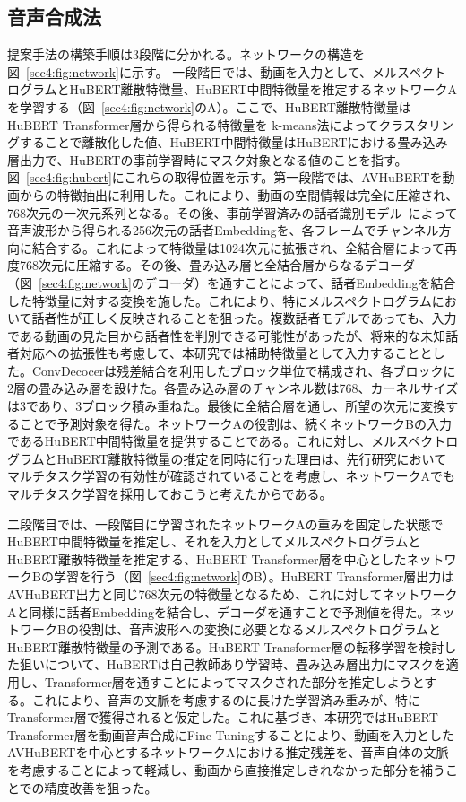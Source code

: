 \documentclass[12pt]{jarticle}
\numberwithin{equation}{section}    %
\numberwithin{figure}{section}      %
\numberwithin{table}{section}      %
\begin{document}
\subsection{音声合成法}
提案手法の構築手順は3段階に分かれる。ネットワークの構造を図~\ref{sec4:fig:network}に示す。
一段階目では、動画を入力として、メルスペクトログラムとHuBERT離散特徴量、HuBERT中間特徴量を推定するネットワークAを学習する（図~\ref{sec4:fig:network}のA）。ここで、HuBERT離散特徴量はHuBERT Transformer層から得られる特徴量を k-means法によってクラスタリングすることで離散化した値、HuBERT中間特徴量はHuBERTにおける畳み込み層出力で、HuBERTの事前学習時にマスク対象となる値のことを指す。図~\ref{sec4:fig:hubert}にこれらの取得位置を示す。第一段階では、AVHuBERTを動画からの特徴抽出に利用した。これにより、動画の空間情報は完全に圧縮され、768次元の一次元系列となる。その後、事前学習済みの話者識別モデル~\cite{wan2018generalized}によって音声波形から得られる256次元の話者Embeddingを、各フレームでチャンネル方向に結合する。これによって特徴量は1024次元に拡張され、全結合層によって再度768次元に圧縮する。その後、畳み込み層と全結合層からなるデコーダ（図~\ref{sec4:fig:network}のデコーダ）を通すことによって、話者Embeddingを結合した特徴量に対する変換を施した。これにより、特にメルスペクトログラムにおいて話者性が正しく反映されることを狙った。複数話者モデルであっても、入力である動画の見た目から話者性を判別できる可能性があったが、将来的な未知話者対応への拡張性も考慮して、本研究では補助特徴量として入力することとした。ConvDecocerは残差結合を利用したブロック単位で構成され、各ブロックに2層の畳み込み層を設けた。各畳み込み層のチャンネル数は768、カーネルサイズは3であり、3ブロック積み重ねた。最後に全結合層を通し、所望の次元に変換することで予測対象を得た。ネットワークAの役割は、続くネットワークBの入力であるHuBERT中間特徴量を提供することである。これに対し、メルスペクトログラムとHuBERT離散特徴量の推定を同時に行った理由は、先行研究においてマルチタスク学習の有効性が確認されていることを考慮し、ネットワークAでもマルチタスク学習を採用しておこうと考えたからである。

二段階目では、一段階目に学習されたネットワークAの重みを固定した状態でHuBERT中間特徴量を推定し、それを入力としてメルスペクトログラムとHuBERT離散特徴量を推定する、HuBERT Transformer層を中心としたネットワークBの学習を行う（図~\ref{sec4:fig:network}のB）。HuBERT Transformer層出力はAVHuBERT出力と同じ768次元の特徴量となるため、これに対してネットワークAと同様に話者Embeddingを結合し、デコーダを通すことで予測値を得た。ネットワークBの役割は、音声波形への変換に必要となるメルスペクトログラムとHuBERT離散特徴量の予測である。HuBERT Transformer層の転移学習を検討した狙いについて、HuBERTは自己教師あり学習時、畳み込み層出力にマスクを適用し、Transformer層を通すことによってマスクされた部分を推定しようとする。これにより、音声の文脈を考慮するのに長けた学習済み重みが、特にTransformer層で獲得されると仮定した。これに基づき、本研究ではHuBERT Transformer層を動画音声合成にFine Tuningすることにより、動画を入力としたAVHuBERTを中心とするネットワークAにおける推定残差を、音声自体の文脈を考慮することによって軽減し、動画から直接推定しきれなかった部分を補うことでの精度改善を狙った。
\end{document}

